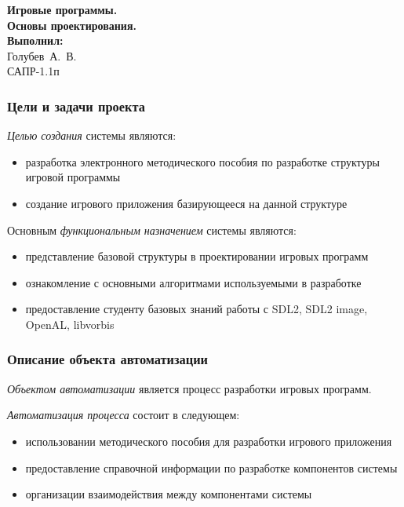 \begin{frame}
    \begin{center}
        \vspace{3.0cm}
        \normalsize
        \textbf{Игровые программы.\\Основы проектирования.} \\
        \vspace{1.4cm}
        \raggedleft\small\textbf{Выполнил:}\\Голубев~А.~В.\\САПР-1.1п\\
        \vspace{1.4cm}
        \vspace{\fill}
         \the\year
    \end{center}
\end{frame}

\begin{frame}
    \frametitle{Цели и задачи проекта}

    \emph{Целью создания} системы являются:
    \begin{itemize}
        \item разработка электронного методического пособия по разработке структуры игровой программы
        \item создание игрового приложения базирующееся на данной структуре
    \end{itemize}

    Основным \emph{функциональным назначением} системы являются:
    \begin{itemize}
        \item представление базовой структуры в проектировании игровых программ
        \item ознакомление с основными алгоритмами используемыми в разработке
        \item предоставление студенту базовых знаний работы с SDL2, SDL2 image, 
            OpenAL, libvorbis
    \end{itemize}
\end{frame}

\begin{frame}
    \frametitle{Описание объекта автоматизации}
    \emph{Объектом автоматизации} является процесс разработки игровых программ.

    \emph{Автоматизация процесса} состоит в следующем:
    \begin{itemize} 
        \item использовании методического пособия для разработки игрового приложения
        \item предоставление справочной информации по разработке компонентов системы
        \item организации взаимодействия между компонентами системы
    \end{itemize}
\end{frame}

